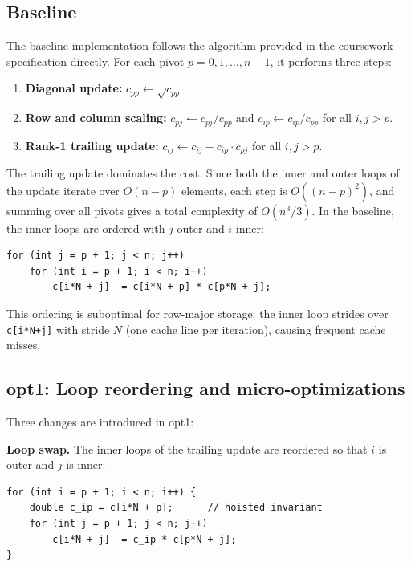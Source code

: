 \documentclass[10pt,leqno]{amsart}
\begin{document}
\subsection{Baseline}

The baseline implementation follows the algorithm provided in the coursework 
specification directly. For each pivot $p = 0, 1, \ldots, n-1$, it performs 
three steps:

\begin{enumerate}
\item \textbf{Diagonal update:} $c_{pp} \leftarrow \sqrt{c_{pp}}$
\item \textbf{Row and column scaling:} $c_{pj} \leftarrow c_{pj}/c_{pp}$ 
and $c_{ip} \leftarrow c_{ip}/c_{pp}$ for all $i, j > p$.
\item \textbf{Rank-1 trailing update:} $c_{ij} \leftarrow c_{ij} - c_{ip}\cdot c_{pj}$ 
for all $i, j > p$.
\end{enumerate}

The trailing update dominates the cost. Since both the inner and outer loops 
of the update iterate over $O(n-p)$ elements, each step is $O((n-p)^2)$, and 
summing over all pivots gives a total complexity of $O(n^3/3)$. In the 
baseline, the inner loops are ordered with $j$ outer and $i$ inner:

\begin{lstlisting}
for (int j = p + 1; j < n; j++)
    for (int i = p + 1; i < n; i++)
        c[i*N + j] -= c[i*N + p] * c[p*N + j];
\end{lstlisting}

This ordering is suboptimal for row-major storage: the inner loop strides 
over \texttt{c[i*N+j]} with stride $N$ (one cache line per iteration), 
causing frequent cache misses.

\subsection{opt1: Loop reordering and micro-optimizations}

Three changes are introduced in opt1:

\noindent\textbf{Loop swap.} The inner loops of the trailing update are 
reordered so that $i$ is outer and $j$ is inner:

\begin{lstlisting}
for (int i = p + 1; i < n; i++) {
    double c_ip = c[i*N + p];      // hoisted invariant
    for (int j = p + 1; j < n; j++)
        c[i*N + j] -= c_ip * c[p*N + j];
}
\end{lstlisting}
\end{document}
